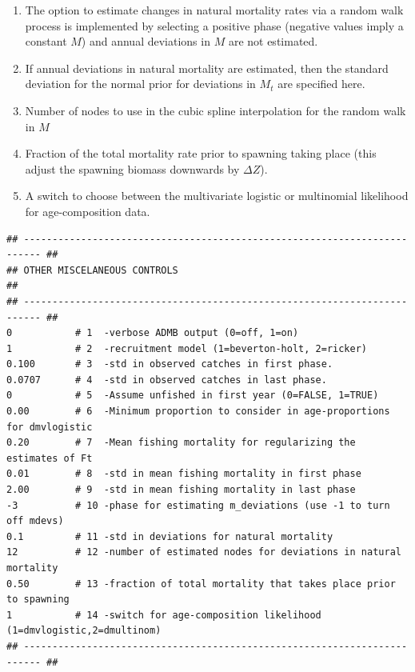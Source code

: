 \begin{multicols}{2}
\begin{enumerate}
	\item The option to estimate changes in natural mortality rates via a random walk process is implemented by selecting a positive phase (negative values imply a constant $M$) and annual deviations in $M$ are not estimated.
	
	\item  If annual deviations in natural mortality are estimated, then the standard deviation for the normal prior for deviations in $M_t$ are specified here.
	
	\item Number of nodes to use in the cubic spline interpolation for the random walk in $M$
	
	\item Fraction of the total mortality rate prior to spawning taking place (this adjust the spawning biomass downwards by $\Delta Z$).
	
	\item A switch to choose between the multivariate logistic or multinomial likelihood for age-composition data.
\end{enumerate}




\begin{tiny}
\begin{verbatim}
## ------------------------------------------------------------------------- ##
## OTHER MISCELANEOUS CONTROLS                                               ##
## ------------------------------------------------------------------------- ##
0           # 1  -verbose ADMB output (0=off, 1=on)
1           # 2  -recruitment model (1=beverton-holt, 2=ricker)
0.100       # 3  -std in observed catches in first phase.
0.0707      # 4  -std in observed catches in last phase.
0           # 5  -Assume unfished in first year (0=FALSE, 1=TRUE)
0.00        # 6  -Minimum proportion to consider in age-proportions for dmvlogistic
0.20        # 7  -Mean fishing mortality for regularizing the estimates of Ft
0.01        # 8  -std in mean fishing mortality in first phase
2.00        # 9  -std in mean fishing mortality in last phase
-3          # 10 -phase for estimating m_deviations (use -1 to turn off mdevs)
0.1         # 11 -std in deviations for natural mortality
12          # 12 -number of estimated nodes for deviations in natural mortality
0.50        # 13 -fraction of total mortality that takes place prior to spawning
1           # 14 -switch for age-composition likelihood (1=dmvlogistic,2=dmultinom)
## ------------------------------------------------------------------------- ##
\end{verbatim}
\end{tiny}


\end{multicols}

